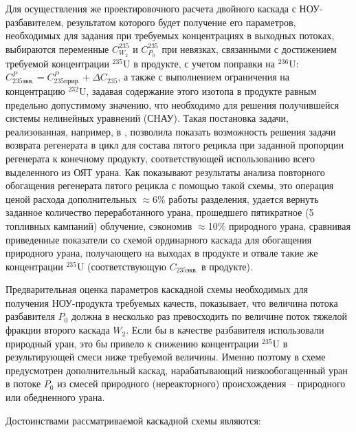 Для осуществления же проектировочного расчета двойного каскада с НОУ-разбавителем, результатом которого будет получение его параметров, необходимых для задания при требуемых концентрациях в выходных потоках, выбираются переменные $C_{W_2}^{235}$ и $C_{P_0}^{235}$ при невязках, связанными с достижением требуемой концентрации $^{235}$U в продукте, с учетом поправки на $^{236}$U: $C_{235 экв.}^{P}=C_{235 прир.}^{P}+\Delta C_{235}$, а также с выполнением ограничения на концентрацию $^{232}$U, задавая содержание этого изотопа в продукте равным предельно допустимому значению, что необходимо для решения получившейся системы нелинейных уравнений (СНАУ). Такая постановка задачи, реализованная, например, в \cite{gusevMultycascadeEnrichmentSchemes2020}, позволила показать возможность решения задачи возврата регенерата в цикл для состава пятого рецикла при заданной пропорции регенерата к конечному продукту, соответствующей использованию всего выделенного из ОЯТ урана. Как показывают результаты анализа повторного обогащения регенерата пятого рецикла с помощью такой схемы, это операция ценой расхода дополнительных $\approx$6\% работы разделения, удается вернуть заданное количество переработанного урана, прошедшего пятикратное (5 топливных кампаний) облучение, сэкономив $\approx$10\% природного урана, сравнивая приведенные показатели со схемой ординарного каскада для обогащения природного урана, получающего на выходах в продукте и отвале такие же концентрации $^{235}$U (соответствующую $C_{235 экв.}$ в продукте).

Предварительная оценка параметров каскадной схемы необходимых для получения НОУ-продукта требуемых качеств, показывает, что величина потока разбавителя $P_0$ должна в несколько раз превосходить по величине поток тяжелой фракции второго каскада $W_2$. Если бы в качестве разбавителя использовали природный уран, это бы привело к снижению концентрации $^{235}$U в результирующей смеси ниже требуемой величины. Именно поэтому в схеме предусмотрен дополнительный каскад, нарабатывающий низкообогащенный уран в потоке $P_0$ из смесей природного (нереакторного) происхождения -- природного или обедненного урана.

Достоинствами рассматриваемой каскадной схемы являются:

